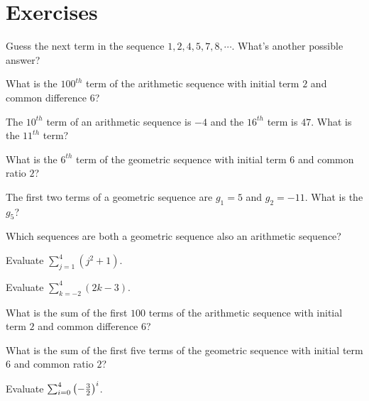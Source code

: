 \section{Exercises}

\begin{exer} 
Guess the next term in the sequence $1,2,4,5,7,8,\cdots$. What's
another possible answer?
\end{exer}

\begin{exer} 
What is the $100^{th}$ term of the arithmetic sequence with initial
term $2$ and common difference $6$?
\end{exer}

\begin{exer}
The $10^{th}$ term of an arithmetic sequence is $-4$
and the $16^{th}$ term is $47$. What is the $11^{th}$ term?
\end{exer}

\begin{exer} 
 What is the $6^{th}$ term of the geometric sequence with initial
term $6$ and common ratio $2$?
\end{exer}

\begin{exer}
The first two terms of a geometric sequence are $g_1=5$ and $g_2=-11$. What is the $g_5$?
\end{exer}

\begin{exer}
Which sequences are both a geometric sequence also an arithmetic sequence?
\end{exer}

\begin{exer} 
 Evaluate $\sum_{j=1}^{4} (j^2+1)$.
\end{exer}

\begin{exer}
  Evaluate $\sum_{k=-2}^{4} (2k-3)$.
\end{exer}

\begin{exer}
 What is the sum of the first $100$ terms  of the arithmetic sequence with initial
term $2$ and common difference $6$?
\end{exer}

\begin{exer} 
 What is the sum of the first five terms of the geometric sequence with initial
term $6$ and common ratio $2$?
\end{exer}

\begin{exer} 
 Evaluate $\sum_{i=0}^{4} \left(-{3\over2}\right)^i$.
 \end{exer}

